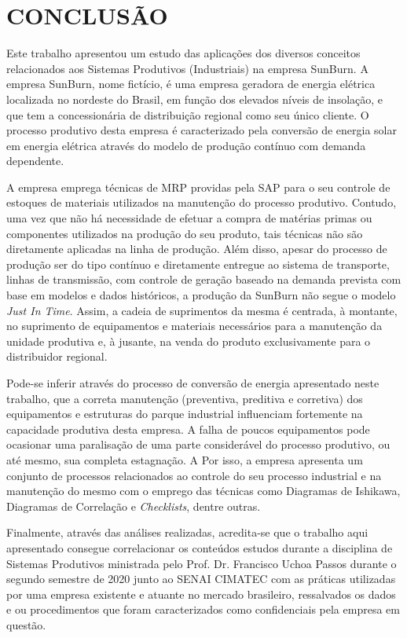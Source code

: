 \chapter{CONCLUSÃO}
\label{chap:conclusao}

Este trabalho apresentou um estudo das aplicações dos diversos conceitos relacionados aos Sistemas Produtivos (Industriais) na empresa SunBurn. A empresa SunBurn, nome fictício, é uma empresa geradora de energia elétrica localizada no nordeste do Brasil, em função dos elevados níveis de insolação, e que tem a concessionária de distribuição regional como seu único cliente. O processo produtivo desta empresa é caracterizado pela conversão de energia solar em energia elétrica através do modelo de produção contínuo com demanda dependente.

A empresa emprega técnicas de \ac{MRP} providas pela \ac{SAP} para o seu controle de estoques de materiais utilizados na manutenção do processo produtivo. Contudo, uma vez que não há necessidade de efetuar a compra de matérias primas ou componentes utilizados na produção do seu produto, tais técnicas não são diretamente aplicadas na linha de produção. Além disso, apesar do processo de produção ser do tipo contínuo e diretamente entregue ao sistema de transporte, linhas de transmissão, com controle de geração baseado na demanda prevista com base em modelos e dados históricos, a produção da SunBurn não segue o modelo \textit{Just In Time}. Assim, a cadeia de suprimentos da mesma é centrada, à montante, no suprimento de equipamentos e materiais necessários para a manutenção da unidade produtiva e, à jusante, na venda do produto exclusivamente para o distribuidor regional.

Pode-se inferir através do processo de conversão de energia apresentado neste trabalho, que a correta manutenção (preventiva, preditiva e corretiva) dos equipamentos e estruturas do parque industrial influenciam fortemente na capacidade produtiva desta empresa. A falha de poucos equipamentos pode ocasionar uma paralisação de uma parte considerável do processo produtivo, ou até mesmo, sua completa estagnação. A Por isso, a empresa apresenta um conjunto de processos relacionados ao controle do seu processo industrial e na manutenção do mesmo com o emprego das técnicas como Diagramas de Ishikawa, Diagramas de Correlação e \textit{Checklists}, dentre outras.

Finalmente, através das análises realizadas, acredita-se que o trabalho aqui apresentado consegue correlacionar os conteúdos estudos durante a disciplina de Sistemas Produtivos ministrada pelo Prof. Dr. Francisco Uchoa Passos durante o segundo semestre de 2020 junto ao SENAI CIMATEC com as práticas utilizadas por uma empresa existente e atuante no mercado brasileiro, ressalvados os dados e ou procedimentos que foram caracterizados como confidenciais pela empresa em questão.